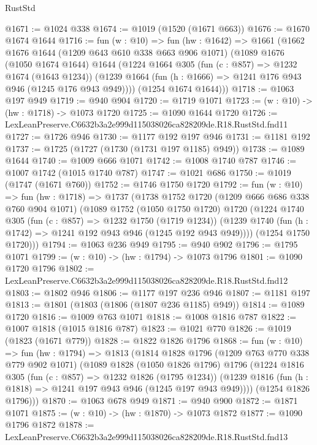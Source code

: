 \begin{lexlean}{RustStd}
\begin{coremodule}
@1671 := @1024 @338
@1674 := @1019 (@1520 (@1671 @663))
@1676 := @1670 @1674 @1644
@1716 := fun (w : @10) =>
  fun (hw : @1642) =>
  @1661
    (@1662
      @1676
      @1644
      (@1209 @643 @610 @338 @663 @906 @1071)
      (@1089
        @1676
        (@1050 @1674 @1644)
        @1644
        (@1224
          @1664
          @305
          (fun (c : @857) => @1232 @1674 (@1643 @1234))
          (@1239 @1664 (fun (h : @1666) => @1241 @176 @943 @946 (@1245 @176 @943 @949))))
        (@1254 @1674 @1644)))
@1718 := @1063 @197 @949
@1719 := @940 @904
@1720 := @1719 @1071
@1723 := (w : @10) -> (hw : @1718) -> @1073 @1720
@1725 := @1090 @1644 @1720
@1726 := LexLeanPreserve.C6632b3a2e999d115038026ca828209de.R18.RustStd.fnd11
@1727 := @1726 @946
@1730 := @1177 @192 @197 @946
@1731 := @1181 @192
@1737 := @1725 (@1727 (@1730 (@1731 @197 @1185) @949))
@1738 := @1089 @1644
@1740 := @1009 @666 @1071
@1742 := @1008 @1740 @787
@1746 := @1007 @1742 (@1015 @1740 @787)
@1747 := @1021 @686
@1750 := @1019 (@1747 (@1671 @760))
@1752 := @1746 @1750 @1720
@1792 := fun (w : @10) =>
  fun (hw : @1718) =>
  @1737
    (@1738
      @1752
      @1720
      (@1209 @666 @686 @338 @760 @904 @1071)
      (@1089
        @1752
        (@1050 @1750 @1720)
        @1720
        (@1224
          @1740
          @305
          (fun (c : @857) => @1232 @1750 (@1719 @1234))
          (@1239 @1740 (fun (h : @1742) => @1241 @192 @943 @946 (@1245 @192 @943 @949))))
        (@1254 @1750 @1720)))
@1794 := @1063 @236 @949
@1795 := @940 @902
@1796 := @1795 @1071
@1799 := (w : @10) -> (hw : @1794) -> @1073 @1796
@1801 := @1090 @1720 @1796
@1802 := LexLeanPreserve.C6632b3a2e999d115038026ca828209de.R18.RustStd.fnd12
@1803 := @1802 @946
@1806 := @1177 @197 @236 @946
@1807 := @1181 @197
@1813 := @1801 (@1803 (@1806 (@1807 @236 @1185) @949))
@1814 := @1089 @1720
@1816 := @1009 @763 @1071
@1818 := @1008 @1816 @787
@1822 := @1007 @1818 (@1015 @1816 @787)
@1823 := @1021 @770
@1826 := @1019 (@1823 (@1671 @779))
@1828 := @1822 @1826 @1796
@1868 := fun (w : @10) =>
  fun (hw : @1794) =>
  @1813
    (@1814
      @1828
      @1796
      (@1209 @763 @770 @338 @779 @902 @1071)
      (@1089
        @1828
        (@1050 @1826 @1796)
        @1796
        (@1224
          @1816
          @305
          (fun (c : @857) => @1232 @1826 (@1795 @1234))
          (@1239 @1816 (fun (h : @1818) => @1241 @197 @943 @946 (@1245 @197 @943 @949))))
        (@1254 @1826 @1796)))
@1870 := @1063 @678 @949
@1871 := @940 @900
@1872 := @1871 @1071
@1875 := (w : @10) -> (hw : @1870) -> @1073 @1872
@1877 := @1090 @1796 @1872
@1878 := LexLeanPreserve.C6632b3a2e999d115038026ca828209de.R18.RustStd.fnd13

\end{coremodule}
\end{lexlean}
